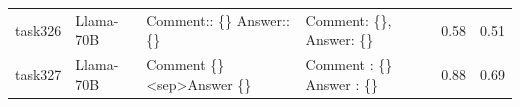 \begin{longtable}{@{}p{0.8cm\tiny}p{1cm\tiny}p{4.1cm\ttfamily\tiny}p{4.1cm\ttfamily\tiny}p{0.8cm\tiny}p{0.8cm\tiny}@{}}
task326   & Llama-70B  & Comment:: \{\} Answer:: \{\}                                                                                                                                                                                                                                                                                                                                                                                                                                                                                            & Comment: \{\}, Answer: \{\}                                                                                                                                                                                                                                                                                                                                                                                                                                                                                                                                                       & 0.58 & 0.51 \\
task327   & Llama-70B  & Comment \{\} \textless{}sep\textgreater Answer \{\}                                                                                                                                                                                                                                                                                                                                                                                                                                                                     & Comment : \{\} Answer : \{\}                                                                                                                                                                                                                                                                                                                                                                                                                                                                                                                                                      & 0.88 & 0.69 \\

\end{longtable}
